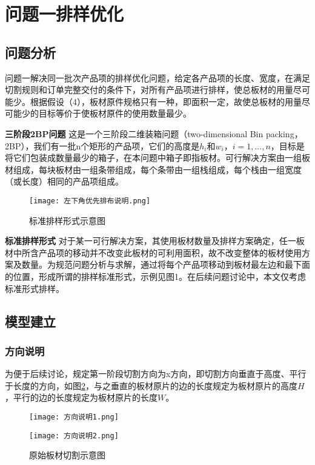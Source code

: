 \documentclass[bwprint]{gmcmthesis}
\begin{document}
\setcounter{table}{0}
\quad 

\section{问题一排样优化}

\subsection{问题分析}

问题一解决同一批次产品项的排样优化问题，给定各产品项的长度、宽度，在满足切割规则和订单完整交付的条件下，对所有产品项进行排样，使总板材的用量尽可能少。根据假设（4），板材原件规格只有一种，即面积一定，故使总板材的用量尽可能少的目标等价于使板材原件的使用数量最少。

\textbf{三阶段2BP问题} \quad 这是一个三阶段二维装箱问题（two-dimensional  {\rm Bin} packing，2BP），我们有一批n个矩形的产品项，它们的高度是$h_i$和$w_i$，$i=1,...,n$，目标是将它们包装成数量最少的箱子，在本问题中箱子即指板材。可行解决方案由一组板材组成，每块板材由一组条带组成，每个条带由一组栈组成，每个栈由一组宽度（或长度）相同的产品项组成。

\begin{figure}[h]
    \centering
        \texttt{[image: 左下角优先排布说明.png]}
        \caption{标准排样形式示意图} \label{左下角优先排布说明}
\end{figure}


\textbf{标准排样形式} \quad 对于某一可行解决方案，其使用板材数量及排样方案确定，任一板材中所含产品项的移动并不改变此板材的可利用面积，故不改变整体的板材使用方案及数量。为规范问题分析与求解，通过将每个产品项移动到板材最左边和最下面的位置，形成所谓的排样标准形式，示例见图1。在后续问题讨论中，本文仅考虑标准形式排样。

\subsection{模型建立}

\subsubsection{方向说明}
为便于后续讨论，规定第一阶段切割方向为x方向，即切割方向垂直于高度、平行于长度的方向，如图\ref{方向说明1}，与之垂直的板材原片的边的长度规定为板材原片的高度$H$，平行的边的长度规定为板材原片的长度$W$。
\begin{figure}[!htbp]
    \centering
    \begin{minipage}{0.48\linewidth}
        \centering
        \texttt{[image: 方向说明1.png]}
    \end{minipage}
    \begin{minipage}{0.48\linewidth}
        \centering
        \texttt{[image: 方向说明2.png]}
    \end{minipage}
    \caption{原始板材切割示意图}\label{方向说明1}
\end{figure}
\end{document}
